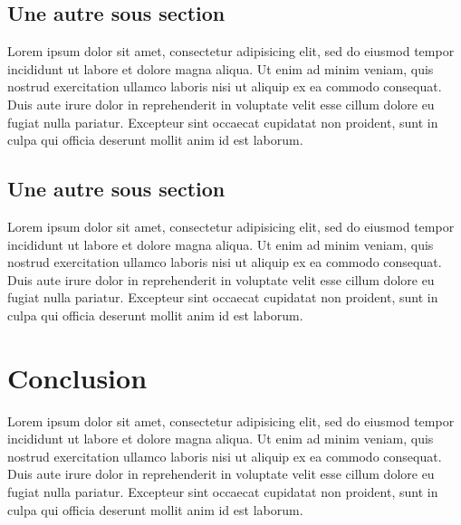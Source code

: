 \subsection{Une autre sous section}
Lorem ipsum dolor sit amet, consectetur adipisicing elit, sed do eiusmod
tempor incididunt ut labore et dolore magna aliqua. Ut enim ad minim veniam,
quis nostrud exercitation ullamco laboris nisi ut aliquip ex ea commodo
consequat. Duis aute irure dolor in reprehenderit in voluptate velit esse
cillum dolore eu fugiat nulla pariatur. Excepteur sint occaecat cupidatat non
proident, sunt in culpa qui officia deserunt mollit anim id est laborum.

\subsection{Une autre sous section}
Lorem ipsum dolor sit amet, consectetur adipisicing elit, sed do eiusmod
tempor incididunt ut labore et dolore magna aliqua. Ut enim ad minim veniam,
quis nostrud exercitation ullamco laboris nisi ut aliquip ex ea commodo
consequat. Duis aute irure dolor in reprehenderit in voluptate velit esse
cillum dolore eu fugiat nulla pariatur. Excepteur sint occaecat cupidatat non
proident, sunt in culpa qui officia deserunt mollit anim id est laborum.

\section{Conclusion}
Lorem ipsum dolor sit amet, consectetur adipisicing elit, sed do eiusmod
tempor incididunt ut labore et dolore magna aliqua. Ut enim ad minim veniam,
quis nostrud exercitation ullamco laboris nisi ut aliquip ex ea commodo
consequat. Duis aute irure dolor in reprehenderit in voluptate velit esse
cillum dolore eu fugiat nulla pariatur. Excepteur sint occaecat cupidatat non
proident, sunt in culpa qui officia deserunt mollit anim id est laborum.